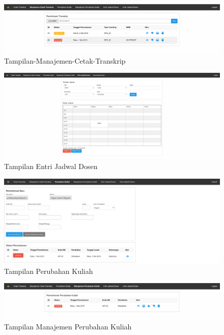 \documentclass[a4paper,twoside]{article}
\begin{document}
\begin{figure}[h]
\includegraphics [scale=0.5] {Tampilan-Manajemen-Cetak-Transkrip.PNG}
\caption{Tampilan-Manajemen-Cetak-Transkrip}
\end{figure}

\begin{figure}[h]
\includegraphics [scale=0.5] {Tampilan-Entri-Jadwal-Dosen.PNG}
\caption{Tampilan Entri Jadwal Dosen}
\end{figure}

\begin{figure}[h]
\includegraphics [scale=0.5] {Tampilan-Perubahan-Kuliah.PNG}
\caption{Tampilan Perubahan Kuliah}
\end{figure}

\begin{figure}[h!]
\includegraphics [scale=0.5] {Tampilan-Manajemen-Perubahan-Kuliah.PNG}
\caption{Tampilan Manajemen Perubahan Kuliah}
\end{figure}
\end{document}
